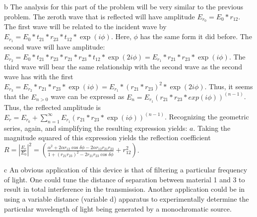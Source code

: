\begin{homeworkProblem}
\begin{homeworkSection}{b}
The analysis for this part of the problem will be very similar to the previous problem. The zeroth wave that is reflected will have amplitude $E_{r_0} = E_0*r_{12}$. The first wave will be related to the incident wave by $E_{r_1} = E_0*t_{21}*r_{23}*t_{12}*\exp(i\phi)$. Here, $\phi$ has the same form it did before. The second wave will have amplitude: $E_{r_2} = E_0*t_{21}*r_{23}*r_{21}*r_{23}*t_{12}*\exp(2 i\phi) = E_{r_1} * r_{21}*r_{23}*\exp(i\phi)$. The third wave will bear the same relationship with the second wave as the second wave has with the first $E_{r_3} = E_{r_2} *r_{21} * r_{23}*\exp(i\phi) = E_{r_1} * (r_{21}*r_{23})^2*\exp(2i\phi)$. Thus, it seems that the $E_{n>0}$ wave can be expressd as $E_{n} = E_{r_1}(r_{21}*r_{23}*exp(i\phi))^(n-1)$.
\\
Thus, the reflected amplitude is $E_{r} = E_{r_0} + \sum\limits_{n=1}^\infty E_{r_1}(r_{21}*r_{23}*\exp(i\phi))^(n-1)$. Recognizing the geometric series, again, and simplifying the resulting expression yields: $a$. Taking the magnitude squared of this expression yields the reflection coefficient $R = |\frac{E_r}{E_0}|^2 = (\frac{\alpha^2 + 2 \alpha r_{12}\cos\delta\phi - 2\alpha r_{12}r_{21}r_{23}}{1+(r_{21}r_{23})^2-2 r_{21} r_{23} \cos\delta\phi} + r_{12}^2)$.
\end{homeworkSection}

\begin{homeworkSection}{c}
An obvious application of this device is that of filtering a particular frequency of light. One could tune the distance of separation between material 1 and 3 to result in total interference in the transmission. Another application could be in using a variable distance (variable d) apparatus to experimentally determine the particular wavelength of light being generated by a monochromatic source.
\end{homeworkSection}
\end{homeworkProblem}
